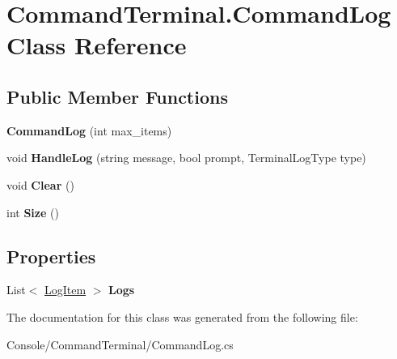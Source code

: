 \hypertarget{class_command_terminal_1_1_command_log}{}\section{Command\+Terminal.\+Command\+Log Class Reference}
\label{class_command_terminal_1_1_command_log}
\subsection*{Public Member Functions}
\begin{DoxyCompactItemize}
\item 
\mbox{\label{class_command_terminal_1_1_command_log_a1e8323467312989d520bb41e5b544336}} 
{\bfseries Command\+Log} (int max\+\_\+items)
\item 
\mbox{\label{class_command_terminal_1_1_command_log_a2d8f073f8834ee6ea712e8e813319cc6}} 
void {\bfseries Handle\+Log} (string message, bool prompt, Terminal\+Log\+Type type)
\item 
\mbox{\label{class_command_terminal_1_1_command_log_a057f3008fd63b0ba047e31649584715f}} 
void {\bfseries Clear} ()
\item 
\mbox{\label{class_command_terminal_1_1_command_log_a89057cc469791017cfbf27bbd8a74e86}} 
int {\bfseries Size} ()
\end{DoxyCompactItemize}
\subsection*{Properties}
\begin{DoxyCompactItemize}
\item 
\mbox{\label{class_command_terminal_1_1_command_log_a856e252795994b69fbe9448a3ea9efc8}} 
List$<$ \mbox{\hyperlink{struct_command_terminal_1_1_log_item}{Log\+Item}} $>$ {\bfseries Logs}
\end{DoxyCompactItemize}


The documentation for this class was generated from the following file\+:\begin{DoxyCompactItemize}
\item 
Console/\+Command\+Terminal/Command\+Log.\+cs\end{DoxyCompactItemize}
